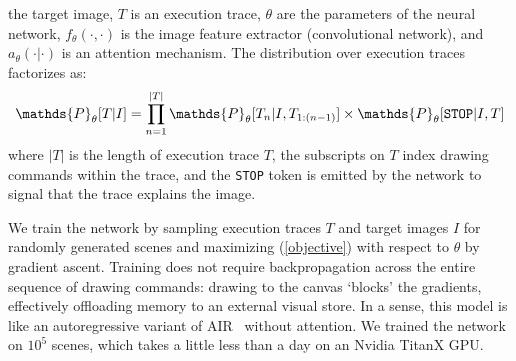 \documentclass{article}
\newcommand{\probability}{\mathds{P}} %
\newcommand{\remark}[1]{\textcolor{red}{[#1]}}
\begin{document}
the target image, $T$ is an execution trace, $\theta$ are the
parameters of the neural network, $f_\theta(\cdot,\cdot)$ is the
image feature extractor (convolutional network), and $a_\theta(\cdot|\cdot)$ is an attention mechanism. The distribution over
execution traces factorizes as:
\begin{equation}
  \probability_\theta [T|I] = \prod_{n = 1}^{|T|} \probability_\theta [T_n | I,T_{1:(n-1)}]\times\probability_\theta [\verb|STOP| | I,T]\label{objective}
\end{equation}
where $|T|$ is the length of execution trace $T$, the subscripts
on $T$ index drawing commands within the trace, and the \verb|STOP|
token is emitted by the network to signal that the trace
explains the image.

We train the network by sampling execution traces $T$ and target
images $I$ for randomly generated scenes
and maximizing
(\ref{objective}) with respect to $\theta$ by gradient ascent.
Training does not require backpropagation across the entire sequence of drawing commands:
drawing to the canvas `blocks' the gradients,
effectively offloading memory to an external visual store.
In a sense, this model is like an autoregressive variant of AIR~\cite{eslami1603attend} without attention.
We trained the network on $10^5$ scenes, which takes a little less than a day on an Nvidia TitanX GPU.

\end{document}
